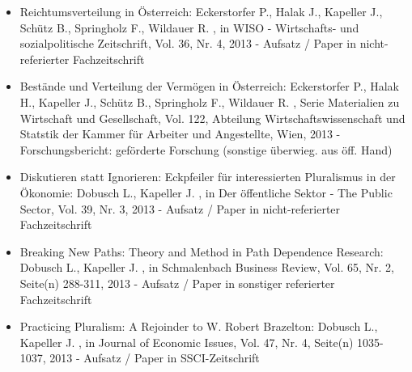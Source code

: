\begin{itemize}
	 \item Reichtumsverteilung in Österreich: Eckerstorfer P., Halak J., Kapeller J., Schütz B., Springholz F., Wildauer R. , in WISO - Wirtschafts- und sozialpolitische Zeitschrift, Vol. 36, Nr. 4, 2013 - Aufsatz / Paper in nicht-referierter Fachzeitschrift
	 \item Bestände und Verteilung der Vermögen in Österreich: Eckerstorfer P., Halak H., Kapeller J., Schütz B., Springholz F., Wildauer R. , Serie Materialien zu Wirtschaft und Gesellschaft, Vol. 122, Abteilung Wirtschaftswissenschaft und Statstik der Kammer für Arbeiter und Angestellte, Wien, 2013 - Forschungsbericht: geförderte Forschung (sonstige überwieg. aus öff. Hand)
	 \item Diskutieren statt Ignorieren: Eckpfeiler für interessierten Pluralismus in der Ökonomie: Dobusch L., Kapeller J. , in Der öffentliche Sektor - The Public Sector, Vol. 39, Nr. 3, 2013 - Aufsatz / Paper in nicht-referierter Fachzeitschrift
	 \item Breaking New Paths: Theory and Method in Path Dependence Research: Dobusch L., Kapeller J. , in Schmalenbach Business Review, Vol. 65, Nr. 2, Seite(n) 288-311, 2013 - Aufsatz / Paper in sonstiger referierter Fachzeitschrift
	 \item Practicing Pluralism: A Rejoinder to W. Robert Brazelton: Dobusch L., Kapeller J. , in Journal of Economic Issues, Vol. 47, Nr. 4, Seite(n) 1035-1037, 2013 - Aufsatz / Paper in SSCI-Zeitschrift
\end{itemize} 
